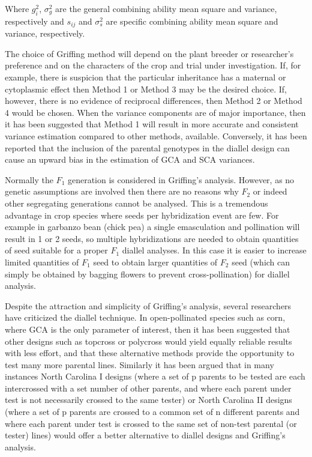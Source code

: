 \documentclass[nofonts,]{tufte-handout}
\begin{document}
Where \(g_i^2\), \(\sigma_g^2\) are the general combining ability mean
square and variance, respectively and \(s_{ij}\) and \(\sigma_s^2\) are
specific combining ability mean square and variance, respectively.

The choice of Griffing method will depend on the plant breeder or
researcher's preference and on the characters of the crop and trial
under investigation. If, for example, there is suspicion that the
particular inheritance has a maternal or cytoplasmic effect then Method
1 or Method 3 may be the desired choice. If, however, there is no
evidence of reciprocal differences, then Method 2 or Method 4 would be
chosen. When the variance components are of major importance, then it
has been suggested that Method 1 will result in more accurate and
consistent variance estimation compared to other methods, available.
Conversely, it has been reported that the inclusion of the parental
genotypes in the diallel design can cause an upward bias in the
estimation of GCA and SCA variances.

Normally the \(F_1\) generation is considered in Griffing's analysis.
However, as no genetic assumptions are involved then there are no
reasons why \(F_2\) or indeed other segregating generations cannot be
analysed. This is a tremendous advantage in crop species where seeds per
hybridization event are few. For example in garbanzo bean (chick pea) a
single emasculation and pollination will result in 1 or 2 seeds, so
multiple hybridizations are needed to obtain quantities of seed suitable
for a proper \(F_1\) diallel analyses. In this case it is easier to
increase limited quantities of \(F_1\) seed to obtain larger quantities
of \(F_2\) seed (which can simply be obtained by bagging flowers to
prevent cross-pollination) for diallel analysis.

Despite the attraction and simplicity of Griffing's analysis, several
researchers have criticized the diallel technique. In open-pollinated
species such as corn, where GCA is the only parameter of interest, then
it has been suggested that other designs such as topcross or polycross
would yield equally reliable results with less effort, and that these
alternative methods provide the opportunity to test many more parental
lines. Similarly it has been argued that in many instances North
Carolina I designs (where a set of p parents to be tested are each
intercrossed with a set number of other parents, and where each parent
under test is not necessarily crossed to the same tester) or North
Carolina II designs (where a set of p parents are crossed to a common
set of n different parents and where each parent under test is crossed
to the same set of non-test parental (or tester) lines) would offer a
better alternative to diallel designs and Griffing's analysis.
\end{document}
